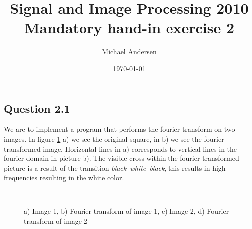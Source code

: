 \documentclass[a4paper, 10pt, final]{article}
\title{Signal and Image Processing 2010 \\ Mandatory hand-in exercise 2}
\author{Michael Andersen}
\date{\today}
\begin{document}
\maketitle

\subsection*{Question 2.1}
We are to implement a program that performs the fourier transform on
two images. In figure \ref{fig:exercise2_1a} a) we see the original
square, in b) we see the fourier transformed image. Horizontal lines
in a) corresponds to vertical lines in the fourier domain in picture
b). The visible cross within the fourier transformed picture is a
result of the transition \emph{black--white--black}, this results in
high frequencies resulting in the white color.

\begin{figure}[!ht]
\centering
{}
 \\
\caption{a) Image 1, b) Fourier transform of image 1, c) Image 2, d) Fourier transform of image 2}
\label{fig:exercise2_1a}
\end{figure}
\end{document}
